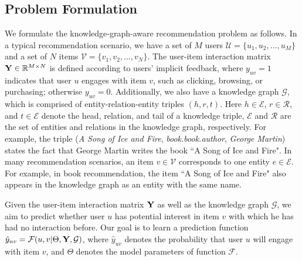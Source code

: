 \documentclass[sigconf]{acmart}
\begin{document}
	\subsection{Problem Formulation}
		We formulate the knowledge-graph-aware recommendation problem as follows.
		In a typical recommendation scenario, we have a set of $M$ users $\mathcal U = \{u_1, u_2, ..., u_M\}$ and a set of $N$ items $\mathcal V = \{v_1, v_2, ..., v_N\}$.
		The user-item interaction matrix ${\bf Y} \in \mathbb R^{M \times N}$ is defined according to users' implicit feedback, where $y_{uv} = 1$ indicates that user $u$ engages with item $v$, such as  clicking, browsing, or purchasing; otherwise $y_{uv} = 0$.
		Additionally, we also have a knowledge graph $\mathcal G$, which is comprised of entity-relation-entity triples $(h, r, t)$.
		Here $h \in \mathcal E$, $r \in \mathcal R$, and $t \in \mathcal E$ denote the head, relation, and tail of a knowledge triple, $\mathcal E$ and $\mathcal R$ are the set of entities and relations in the knowledge graph, respectively.
		For example, the triple (\textit{A Song of Ice and Fire}, \textit{book.book.author}, \textit{George Martin}) states the fact that George Martin writes the book ``A Song of Ice and Fire".
		In many recommendation scenarios, an item $v \in \mathcal V$ corresponds to one entity $e \in \mathcal E$.
		For example, in book recommendation, the item ``A Song of Ice and Fire" also appears in the knowledge graph as an entity with the same name.


		Given the user-item interaction matrix $\bf Y$ as well as the knowledge graph $\mathcal G$, we aim to predict whether user $u$ has potential interest in item $v$ with which he has had no interaction before.
		Our goal is to learn a prediction function ${\hat y}_{uv} = \mathcal F(u, v | \Theta, \bf Y, \mathcal G)$, where ${\hat y}_{uv}$ denotes the probability that user $u$ will engage with item $v$, and $\Theta$ denotes the model parameters of function $\mathcal F$.
	
	
\end{document}
